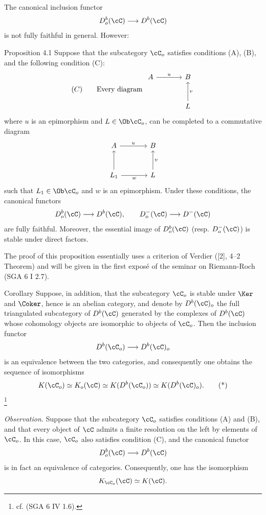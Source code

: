 The canonical inclusion functor
\[
D_o^b(\cC)\longrightarrow D^b(\cC)
\]
is not fully faithful in general. However:

\begin{statement}{Proposition 4.1}
Suppose that the subcategory $\cC_o$ satisfies conditions (A), (B), and the following condition (C):
\[
(C)\qquad
\text{Every diagram }
\begin{tikzcd}[column sep=large,row sep=large]
A \arrow[r,"u"]&B\\
&L \arrow[u,"v"']
\end{tikzcd}
\]
where $u$ is an epimorphism and $L\in\Ob\cC_o$, can be completed to a commutative diagram
\[
\begin{tikzcd}[column sep=large,row sep=large]
A \arrow[r,"u"]&B\\
L_1 \arrow[u] \arrow[r,"w"']&L \arrow[u,"v"']
\end{tikzcd}
\]
such that $L_1\in\Ob\cC_o$ and $w$ is an epimorphism. Under these conditions, the canonical functors
\[
D_o^b(\cC)\longrightarrow D^b(\cC),\qquad
D_o^-(\cC)\longrightarrow D^-(\cC)
\]
are fully faithful. Moreover, the essential image of $D_o^b(\cC)$ (resp. $D_o^-(\cC)$) is stable under direct factors.
\end{statement}

The proof of this proposition essentially uses a criterion of Verdier ([2], 4--2 Theorem) and will be given in the first exposé of the seminar on Riemann-Roch (SGA 6 I 2.7).

\begin{statement}{Corollary}
Suppose, in addition, that the subcategory $\cC_o$ is stable under $\Ker$ and $\Coker$, hence is an abelian category, and denote by $D^b(\cC)_o$ the full triangulated subcategory of $D^b(\cC)$ generated by the complexes of $D^b(\cC)$ whose cohomology objects are isomorphic to objects of $\cC_o$. Then the inclusion functor
\[
D^b(\cC_o)\longrightarrow D^b(\cC)_o
\]
is an equivalence between the two categories, and consequently one obtains the sequence of isomorphisms
\[
K(\cC_o)\simeq K_o(\cC)\simeq K(D^b(\cC_o))\simeq K(D^b(\cC)_o).
\tag{*}
\]
\footnote{cf. (SGA 6 IV 1.6).}
\end{statement}

\emph{Observation.} Suppose that the subcategory $\cC_o$ satisfies conditions (A) and (B), and that every object of $\cC$ admits a finite resolution on the left by elements of $\cC_o$. In this case, $\cC_o$ also satisfies condition (C), and the canonical functor
\[
D_o^b(\cC)\longrightarrow D^b(\cC)
\]
is in fact an equivalence of categories. Consequently, one has the isomorphism
\[
K_{\cC_o}(\cC)\simeq K(\cC).
\]

